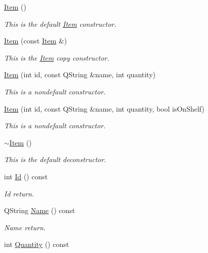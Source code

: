 \begin{DoxyCompactItemize}
\item 
\hyperlink{class_item_a297720c02984eab37332ae795d22189d}{Item} ()
\begin{DoxyCompactList}\small\item\em This is the default \hyperlink{class_item}{Item} constructor. \end{DoxyCompactList}\item 
\hyperlink{class_item_afc899efe46f7dc6d85e461cb2ca9ebaf}{Item} (const \hyperlink{class_item}{Item} \&)
\begin{DoxyCompactList}\small\item\em This is the \hyperlink{class_item}{Item} copy constructor. \end{DoxyCompactList}\item 
\hyperlink{class_item_a344bcf40797aec4d8504b5eeb116d03d}{Item} (int id, const Q\+String \&name, int quantity)
\begin{DoxyCompactList}\small\item\em This is a nondefault constructor. \end{DoxyCompactList}\item 
\hyperlink{class_item_ad0cc8be6fae78de7c88f937265fcf9de}{Item} (int id, const Q\+String \&name, int quantity, bool is\+On\+Shelf)
\begin{DoxyCompactList}\small\item\em This is a nondefault constructor. \end{DoxyCompactList}\item 
\hyperlink{class_item_a11663c84075b78c3ae5e30fdfcd7c458}{$\sim$\+Item} ()
\begin{DoxyCompactList}\small\item\em This is the default deconstructor. \end{DoxyCompactList}\item 
int \hyperlink{class_item_a44199628f22d918876d21c415a545b0d}{Id} () const 
\begin{DoxyCompactList}\small\item\em Id return. \end{DoxyCompactList}\item 
Q\+String \hyperlink{class_item_a591cfd33ce61df595047b45a4fdec052}{Name} () const 
\begin{DoxyCompactList}\small\item\em Name return. \end{DoxyCompactList}\item 
int \hyperlink{class_item_a2fe9750d2081ea58d178e1d4d7200eda}{Quantity} () const 

\end{DoxyCompactItemize}
